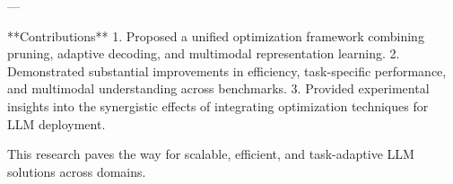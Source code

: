 ---

**Contributions**  
1. Proposed a unified optimization framework combining pruning, adaptive decoding, and multimodal representation learning.  
2. Demonstrated substantial improvements in efficiency, task-specific performance, and multimodal understanding across benchmarks.  
3. Provided experimental insights into the synergistic effects of integrating optimization techniques for LLM deployment.  

This research paves the way for scalable, efficient, and task-adaptive LLM solutions across domains.  